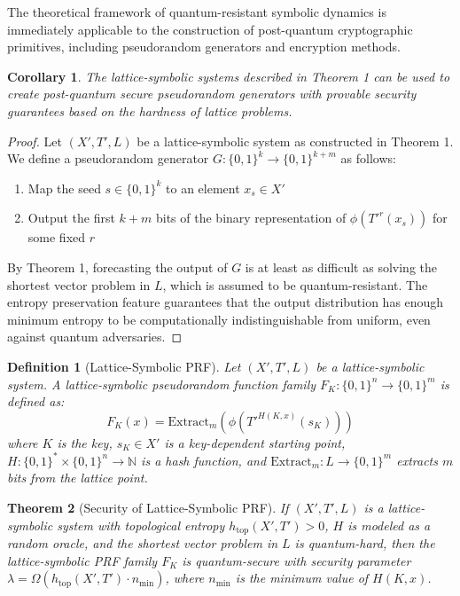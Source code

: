 \documentclass[12pt,a4paper]{article}
\newtheorem{theorem}{Theorem}[section]
\newtheorem{corollary}[theorem]{Corollary}
\newtheorem{definition}{Definition}
\begin{document}
The theoretical framework of quantum-resistant symbolic dynamics is immediately applicable to the construction of post-quantum cryptographic primitives, including pseudorandom generators and encryption methods.

\begin{corollary}
The lattice-symbolic systems described in Theorem 1 can be used to create post-quantum secure pseudorandom generators with provable security guarantees based on the hardness of lattice problems.
\end{corollary}

\begin{proof}
Let $(X', T', L)$ be a lattice-symbolic system as constructed in Theorem 1. We define a pseudorandom generator $G: \{0,1\}^k \rightarrow \{0,1\}^{k+m}$ as follows:

\begin{enumerate}
\item Map the seed $s \in \{0,1\}^k$ to an element $x_s \in X'$
\item Output the first $k+m$ bits of the binary representation of $\phi(T'^r(x_s))$ for some fixed $r$
\end{enumerate}

By Theorem 1, forecasting the output of $G$ is at least as difficult as solving the shortest vector problem in $L$, which is assumed to be quantum-resistant. The entropy preservation feature guarantees that the output distribution has enough minimum entropy to be computationally indistinguishable from uniform, even against quantum adversaries.
\end{proof}

\begin{definition}[Lattice-Symbolic PRF]
Let $(X', T', L)$ be a lattice-symbolic system. A lattice-symbolic pseudorandom function family $F_K: \{0,1\}^n \rightarrow \{0,1\}^m$ is defined as:
\begin{equation}
F_K(x) = \text{Extract}_m(\phi(T'^{H(K,x)}(s_K)))
\end{equation}
where $K$ is the key, $s_K \in X'$ is a key-dependent starting point, $H: \{0,1\}^* \times \{0,1\}^n \rightarrow \mathbb{N}$ is a hash function, and $\text{Extract}_m: L \rightarrow \{0,1\}^m$ extracts $m$ bits from the lattice point.
\end{definition}

\begin{theorem}[Security of Lattice-Symbolic PRF]
If $(X', T', L)$ is a lattice-symbolic system with topological entropy $h_{\text{top}}(X',T') > 0$, $H$ is modeled as a random oracle, and the shortest vector problem in $L$ is quantum-hard, then the lattice-symbolic PRF family $F_K$ is quantum-secure with security parameter $\lambda = \Omega(h_{\text{top}}(X',T') \cdot n_{\min})$, where $n_{\min}$ is the minimum value of $H(K,x)$.
\end{theorem}
\end{document}
